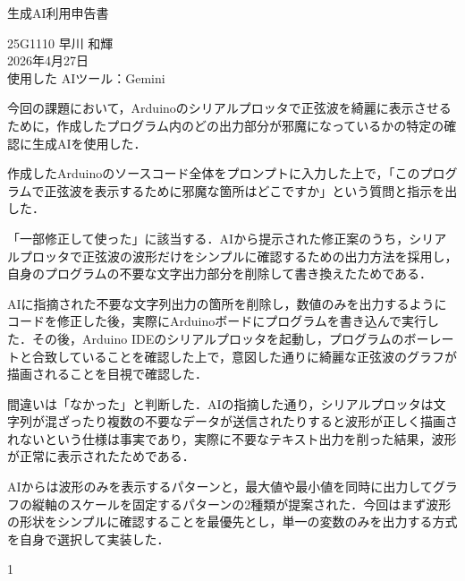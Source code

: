 \documentclass[uplatex,dvipdfmx,ja=standard,a4paper,11pt]{bxjsarticle}
\begin{document}
\begin{center}
    {\huge 生成AI利用申告書}
\end{center}

\vspace{1.5em}

\noindent
25G1110 早川 和輝 \\
2026年4月27日 \\
使用した AIツール：Gemini

\vspace{2em}

\noindent
今回の課題において，Arduinoのシリアルプロッタで正弦波を綺麗に表示させるために，作成したプログラム内のどの出力部分が邪魔になっているかの特定の確認に生成AIを使用した．

\vspace{1em}

\noindent
作成したArduinoのソースコード全体をプロンプトに入力した上で，「このプログラムで正弦波を表示するために邪魔な箇所はどこですか」という質問と指示を出した．

\vspace{1em}

\noindent
「一部修正して使った」に該当する．AIから提示された修正案のうち，シリアルプロッタで正弦波の波形だけをシンプルに確認するための出力方法を採用し，自身のプログラムの不要な文字出力部分を削除して書き換えたためである．

\vspace{1em}

\noindent
AIに指摘された不要な文字列出力の箇所を削除し，数値のみを出力するようにコードを修正した後，実際にArduinoボードにプログラムを書き込んで実行した．その後，Arduino IDEのシリアルプロッタを起動し，プログラムのボーレートと合致していることを確認した上で，意図した通りに綺麗な正弦波のグラフが描画されることを目視で確認した．

\vspace{1em}

\noindent
間違いは「なかった」と判断した．AIの指摘した通り，シリアルプロッタは文字列が混ざったり複数の不要なデータが送信されたりすると波形が正しく描画されないという仕様は事実であり，実際に不要なテキスト出力を削った結果，波形が正常に表示されたためである．

\vspace{1em}

\noindent
AIからは波形のみを表示するパターンと，最大値や最小値を同時に出力してグラフの縦軸のスケールを固定するパターンの2種類が提案された．今回はまず波形の形状をシンプルに確認することを最優先とし，単一の変数のみを出力する方式を自身で選択して実装した．

\vfill
\begin{center}
1
\end{center}
\end{document}

